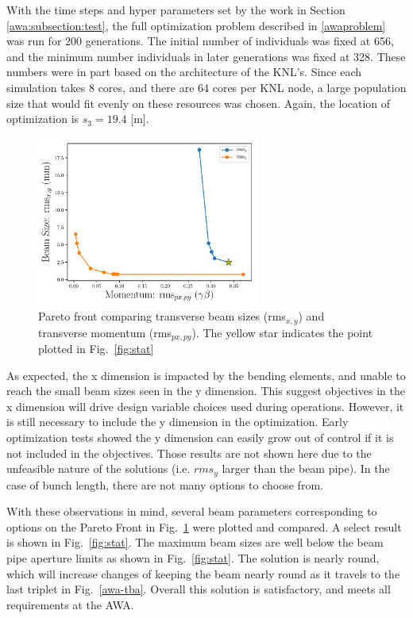 With the time steps and hyper parameters set by the work in Section \ref{awa:subsection:test}, 
the full optimization problem described in \ref{awaproblem} was run for 200 generations.
The initial number of individuals was fixed at 656, 
and the minimum number individuals in later generations was fixed at 328. 
These numbers were in part based on the architecture of the KNL's. 
Since each simulation takes 8 cores, and there are 64 cores per KNL node, 
a large population size that would fit evenly on these resources was chosen. 
Again, the location of optimization is $s_3=19.4$ [m]. 
\begin{figure}
	\begin{center}		
		\includegraphics[width=0.65\textwidth]{figures/paperedit_pareto_front_Q5_xy_vs_pxpy}
	\end{center} 
		\caption{Pareto front comparing transverse beam sizes (rms$_{x,y}$) and transverse momentum (rms$_{px,py}$). The yellow star indicates the 
		point plotted in Fig.~\ref{fig:stat}}
	\label{fig:pareto1}
\end{figure}
 
As expected, the x dimension is impacted by the bending elements, and unable to reach 
the small beam sizes seen in the y dimension. This suggest objectives in the x 
dimension will drive design variable choices used during operations. 
However, it is still necessary to 
include the y dimension in the optimization. Early optimization tests showed the y dimension 
can easily grow out of control if it is not included in the objectives.
Those results are not shown here due to the unfeasible nature of the solutions 
(i.e. $rms_y$ larger than the beam pipe).
In the case of bunch length, there are not many options to choose from.


With these observations in mind, several beam parameters corresponding to
options on the Pareto Front in Fig.~\ref{fig:pareto1} were plotted and compared. 
A select result is shown in Fig.~\ref{fig:stat}.  
The maximum beam sizes are well below the beam pipe aperture limits as shown in Fig.~\ref{fig:stat}.
The solution is nearly round, which will increase changes of keeping the beam nearly round
as it travels to the last triplet in Fig.~\ref{awa-tba}.
Overall this solution is satisfactory, and meets all requirements at the AWA.


